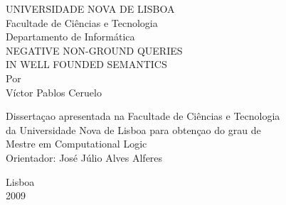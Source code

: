 \documentclass[12pt,twoside,a4paper,english]{book}
\renewcommand{\title}{NEGATIVE NON-GROUND QUERIES \\ IN WELL FOUNDED SEMANTICS}
\renewcommand{\author}{V\'{i}ctor Pablos Ceruelo}
\newcommand{\supervisor}{Jos\'{e} J\'{u}lio Alves Alferes}
\theoremstyle{example}
\theoremstyle{example*}
\theoremstyle{program}
\theoremstyle{th-head}
\theoremstyle{remark}
\theoremstyle{algorithm}
\newcommand{\clearemptydoublepage}
{\newpage{\pagestyle{empty}\cleardoublepage}}
\begin{document}

\clearemptydoublepage{}
\pagestyle{empty}

\vspace{1cm}
\begin{center}
  \begin{Large}
    \vspace{3cm}
    UNIVERSIDADE NOVA DE LISBOA \\
    Facultade de Ciências e Tecnologia\\
    Departamento de Informática \\
    \vspace{4cm}
    \title \\
    \vspace{4cm}
    Por \\
    \author \\
  \end{Large}
  \begin{large}
    \vspace{3cm}
      Dissertaçao apresentada na Facultade de Ciências e Tecnologia \\
      da Universidade Nova de Lisboa para obtençao do grau de \\
      Mestre em Computational Logic \\
    \vspace{1cm}
    Orientador: \supervisor \\
  \end{large}
  \vspace{1cm}
  \begin{Large}
    Lisboa \\
    \vspace{0.5cm}
    2009
  \end{Large}
\end{center}



\end{document}
